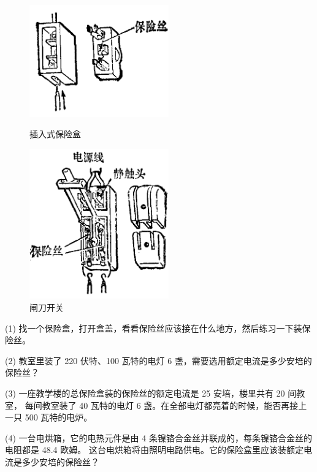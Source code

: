 \begin{figure}[htbp]
    \centering
    \begin{minipage}{7cm}
    \centering
    \vspace{1.5cm}
    \includegraphics[width=6cm]{../pic/czwl2-ch11-6}
    \caption{插入式保险盒}\label{fig:11-6}
    \end{minipage}
    \qquad
    \begin{minipage}{7cm}
    \centering
    \includegraphics[width=6cm]{../pic/czwl2-ch11-7}
    \caption{闸刀开关}\label{fig:11-7}
    \end{minipage}
\end{figure}


\lianxi

(1) 找一个保险盒，打开盒盖，看看保险丝应该接在什么地方，然后练习一下装保险丝。

(2) 教室里装了 220 伏特、100 瓦特的电灯 6 盏，需要选用额定电流是多少安培的保险丝？

(3) 一座教学楼的总保险盒装的保险丝的额定电流是 25 安培，楼里共有 20 间教室，
每间教室装了 40 瓦特的电灯 6 盏。在全部电灯都亮着的时候，能否再接上一只 500 瓦特的电炉。

(4) 一台电烘箱，它的电热元件是由 4 条镍铬合金丝并联成的，每条镍铬合金丝的电阻都是 48.4 欧姆。
这台电烘箱将由照明电路供电。它的保险盒里应该装额定电流是多少安培的保险丝？


